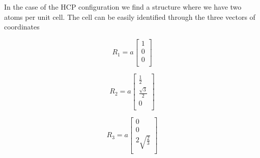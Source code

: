 \documentclass[a4paper]{article}
\begin{document}
In the case of the HCP configuration we find a structure where we have two atoms per unit cell.
The cell can be easily identified through the three vectors of coordinates\\
\begin{minipage}{0.3\textwidth}
\centering
\begin{equation*}
R_1 = a
\begin{bmatrix}
	1 \\
    0 \\
    0 \\
    
\end{bmatrix}
\end{equation*}

\end{minipage}
\begin{minipage}{0.3\textwidth}
\centering
\begin{equation*}
R_2 = a
\begin{bmatrix}
    \frac{1}{2} \\
    \frac{\sqrt{3}}{2}  \\
    0 \\
\end{bmatrix}
\end{equation*}
\end{minipage}
\begin{minipage}{0.3\textwidth}
\centering
\begin{equation*}
R_3 = a
\begin{bmatrix}
    0 \\
    0 \\
    2\sqrt{\frac{2}{3}} \\
\end{bmatrix}
\end{equation*}
\end{minipage}
\end{document}
